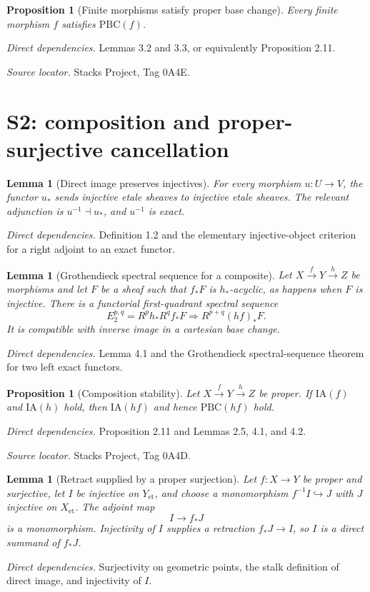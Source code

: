 \documentclass[10pt]{article}
\newtheorem{proposition}[theorem]{Proposition}
\newtheorem{lemma}[theorem]{Lemma}
\theoremstyle{definition}
\newcommand{\Et}{\mathrm{et}}
\newcommand{\deps}[1]{\par\smallskip\textit{Direct dependencies.} #1\par}
\newcommand{\sources}[1]{\par\textit{Source locator.} #1\par}
\begin{document}
\begin{proposition}[Finite morphisms satisfy proper base change]
Every finite morphism $f$ satisfies $\mathrm{PBC}(f)$.
\end{proposition}
\deps{Lemmas 3.2 and 3.3, or equivalently Proposition 2.11.}
\sources{Stacks Project, Tag 0A4E.}

\section{S2: composition and proper-surjective cancellation}

\begin{lemma}[Direct image preserves injectives]
For every morphism $u:U\to V$, the functor $u_*$ sends injective etale
sheaves to injective etale sheaves.  The relevant adjunction is
$u^{-1}\dashv u_*$, and $u^{-1}$ is exact.
\end{lemma}
\deps{Definition 1.2 and the elementary injective-object criterion for a
right adjoint to an exact functor.}

\begin{lemma}[Grothendieck spectral sequence for a composite]
Let $X\xrightarrow{f}Y\xrightarrow{h}Z$ be morphisms and let $F$ be a
sheaf such that $f_*F$ is $h_*$-acyclic, as happens when $F$ is injective.
There is a functorial first-quadrant spectral sequence
\[
 E_2^{p,q}=R^ph_*R^qf_*F
 \Longrightarrow R^{p+q}(hf)_*F.
\]
It is compatible with inverse image in a cartesian base change.
\end{lemma}
\deps{Lemma 4.1 and the Grothendieck spectral-sequence theorem for two
left exact functors.}

\begin{proposition}[Composition stability]
Let $X\xrightarrow{f}Y\xrightarrow{h}Z$ be proper.  If
$\mathrm{IA}(f)$ and $\mathrm{IA}(h)$ hold, then
$\mathrm{IA}(hf)$ and hence $\mathrm{PBC}(hf)$ hold.
\end{proposition}
\deps{Proposition 2.11 and Lemmas 2.5, 4.1, and 4.2.}
\sources{Stacks Project, Tag 0A4D.}

\begin{lemma}[Retract supplied by a proper surjection]
Let $f:X\to Y$ be proper and surjective, let $I$ be injective on
$Y_{\Et}$, and choose a monomorphism $f^{-1}I\hookrightarrow J$ with $J$
injective on $X_{\Et}$.  The adjoint map
\[
 I\longrightarrow f_*J
\]
is a monomorphism.  Injectivity of $I$ supplies a retraction
$f_*J\to I$, so $I$ is a direct summand of $f_*J$.
\end{lemma}
\deps{Surjectivity on geometric points, the stalk definition of direct
image, and injectivity of $I$.}
\end{document}
